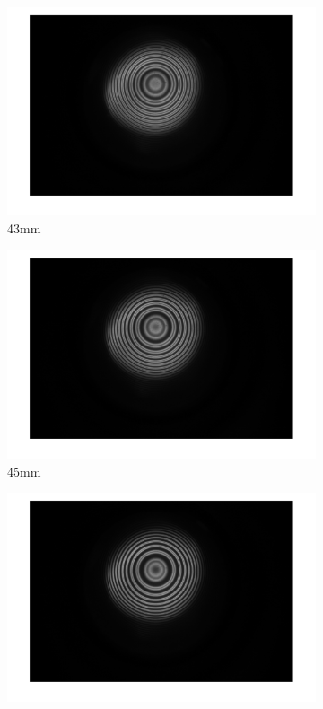 \documentclass[a4paper,12pt]{article}
\begin{document}
    \begin{figure}[H]
      \centering
      
      \begin{subfigure}[b]{0.3\textwidth}
        \includegraphics[width=1.2\textwidth]{tra_ano_stripe_ver_43.png}
        \caption{43mm}
      \end{subfigure}
      \hfill
      \begin{subfigure}[b]{0.3\textwidth}
        \includegraphics[width=1.2\textwidth]{tra_ano_stripe_ver_45.png}
        \caption{45mm}
      \end{subfigure}
      \hfill
      \begin{subfigure}[b]{0.3\textwidth}
        \includegraphics[width=1.2\textwidth]{tra_ano_stripe_ver_48.png}

\end{subfigure}
\end{figure}
\end{document}
